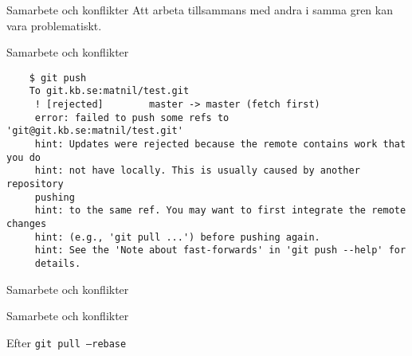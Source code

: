 \documentclass[11pt,xetex]{beamer}
\begin{document}
\begin{frame}{Samarbete och konflikter}
  \Large
  Att arbeta tillsammans med andra i samma gren kan vara problematiskt.
\end{frame}

\begin{frame}[fragile]{Samarbete och konflikter}
  \begin{verbatim}
    $ git push
    To git.kb.se:matnil/test.git
     ! [rejected]        master -> master (fetch first)
     error: failed to push some refs to 'git@git.kb.se:matnil/test.git'
     hint: Updates were rejected because the remote contains work that you do
     hint: not have locally. This is usually caused by another repository
     pushing
     hint: to the same ref. You may want to first integrate the remote changes
     hint: (e.g., 'git pull ...') before pushing again.
     hint: See the 'Note about fast-forwards' in 'git push --help' for
     details.
  \end{verbatim}
\end{frame}

\begin{frame}{Samarbete och konflikter}
  \captionsetup{type=table}
  \begin{subfigure}[t]{\textwidth}
    \centering
  \end{subfigure}
\end{frame}

\begin{frame}{Samarbete och konflikter}
  \captionsetup{type=table}
  \begin{subfigure}[t]{\textwidth}
    \centering
  \end{subfigure}

  \center
  Efter \texttt{git pull --rebase}
\end{frame}
\end{document}
